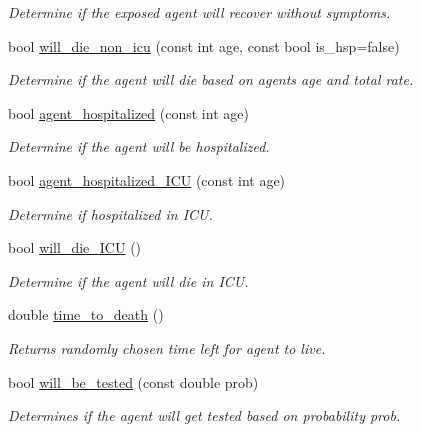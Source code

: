 \begin{DoxyCompactItemize}
\begin{DoxyCompactList}\small\item\em Determine if the exposed agent will recover without symptoms. \end{DoxyCompactList}\item 
bool \hyperlink{classInfection_aa01e23dfc716651fccfeaa7ee254b767}{will\+\_\+die\+\_\+non\+\_\+icu} (const int age, const bool is\+\_\+hsp=false)
\begin{DoxyCompactList}\small\item\em Determine if the agent will die based on agents age and total rate. \end{DoxyCompactList}\item 
bool \hyperlink{classInfection_ae1c34ce8c8e545529c5a3178bd6c1362}{agent\+\_\+hospitalized} (const int age)
\begin{DoxyCompactList}\small\item\em Determine if the agent will be hospitalized. \end{DoxyCompactList}\item 
bool \hyperlink{classInfection_a876b380a5c807d6a904bcf6e293748b6}{agent\+\_\+hospitalized\+\_\+\+I\+CU} (const int age)
\begin{DoxyCompactList}\small\item\em Determine if hospitalized in I\+CU. \end{DoxyCompactList}\item 
bool \hyperlink{classInfection_adbedec09bbbb05f1734f34c4ec4e667d}{will\+\_\+die\+\_\+\+I\+CU} ()
\begin{DoxyCompactList}\small\item\em Determine if the agent will die in I\+CU. \end{DoxyCompactList}\item 
double \hyperlink{classInfection_a926eaa505c376d8823c510873d606d90}{time\+\_\+to\+\_\+death} ()
\begin{DoxyCompactList}\small\item\em Returns randomly chosen time left for agent to live. \end{DoxyCompactList}\item 
bool \hyperlink{classInfection_a7bffd45c44c33bbd62d2dcf4c2db380c}{will\+\_\+be\+\_\+tested} (const double prob)
\begin{DoxyCompactList}\small\item\em Determines if the agent will get tested based on probability prob. \end{DoxyCompactList}\item 

\end{DoxyCompactItemize}
